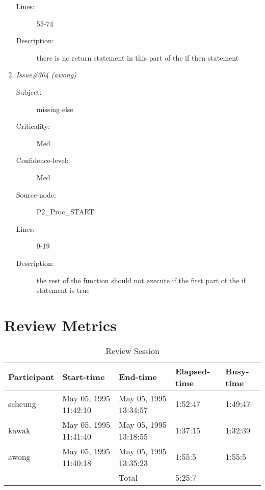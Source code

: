 \begin{enumerate}
\begin{description}
\item [Lines:] 55-74

\item [Description:] there is no return statement in this part of
the if then statement
\end{description}
\item {\it Issue\#304 (awong)}
\begin{description}
\item [Subject:] missing else
\item [Criticality:] Med
\item [Confidence-level:] Med
\item [Source-node:] P2\_Proc\_START

\item [Lines:] 9-19

\item [Description:] the rest of the function should not execute if
the first part of the if statement is true
\end{description}
\end{enumerate}
\section{Review Metrics}
\begin{table}[hb]
\begin{center}
\begin{tabular}{|l|l|l|l|l|}
\hline
Participant & Start-time & End-time & Elapsed-time & Busy-time \\
\hline
scheung & May 05, 1995 11:42:10 & May 05, 1995 13:34:57 & 1:52:47 & 1:49:47 \\
kawak & May 05, 1995 11:41:40 & May 05, 1995 13:18:55 & 1:37:15 & 1:32:39 \\
awong & May 05, 1995 11:40:18 & May 05, 1995 13:35:23 & 1:55:5 & 1:55:5 \\
\hline
 & & Total & 5:25:7 & \\
\hline
\end{tabular}
\end{center}
\caption{Review Session}
\end{table}


